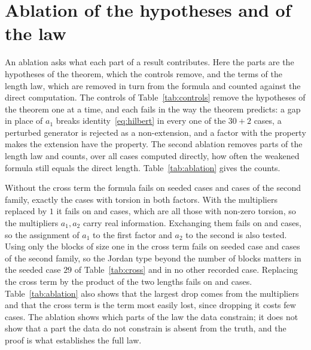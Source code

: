 \documentclass[11pt]{article}
\theoremstyle{definition}
\theoremstyle{remark}
\begin{document}
\section{Ablation of the hypotheses and of the law}\label{sec:ablation}

An ablation asks what each part of a result contributes. Here the parts are the hypotheses of the theorem, which the controls remove, and the terms of the length law, which are removed in turn from the formula and counted against the direct computation.
The controls of Table~\ref{tab:controls} remove the hypotheses of the theorem one at a time, and each fails in the way the theorem predicts: a gap in place of $a_1$ breaks identity~\eqref{eq:hilbert} in every one of the
$30+2$ cases, a perturbed generator is rejected as a non-extension, and a factor with the property makes the extension have the property. The second ablation removes parts of the length law and counts, over all
cases computed directly, how often the weakened formula still equals the direct length. Table~\ref{tab:ablation} gives the counts.

\begin{table}[t]
\centering\footnotesize
\resizebox{\textwidth}{!}{}
\caption{Ablation of the length law on the cases computed directly: the number of cases in which each weakened formula equals the direct torsion length, for the seeded family, the counterexample-factor family and both.}\label{tab:ablation}
\end{table}

Without the cross term the formula fails on \AblNoCrossSeeded{} seeded cases and \AblNoCrossHard{} cases of the second family, exactly the cases with torsion in both factors. With the multipliers replaced by $1$ it
fails on \AblOnesSeeded{} and \AblOnesHard{} cases, which are all those with non-zero torsion, so the multipliers $a_1,a_2$ carry real information. Exchanging them fails on \AblSwapSeeded{} and \AblSwapHard{} cases, so the assignment of
$a_1$ to the first factor and $a_2$ to the second is also tested. Using only the blocks of size one in the cross term fails on \AblBlockOneSeeded{} seeded case and \AblBlockOneHard{} cases of the second family, so the Jordan type beyond
the number of blocks matters in the seeded case $29$ of Table~\ref{tab:cross} and in no other recorded case. Replacing the cross term by the product of the two lengths fails on \AblProductSeeded{} and \AblProductHard{} cases.
Table~\ref{tab:ablation} also shows that the largest drop comes from the multipliers and that the cross term is the term most easily lost, since dropping it costs few cases. The ablation shows which parts of the law the data constrain; it does not show that a part the data do not constrain is absent from the truth, and the proof is what establishes the full law.
\end{document}
